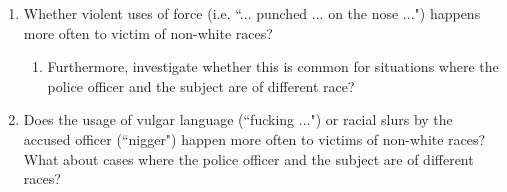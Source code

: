 \documentclass[10pt]{article}
\begin{document}
\begin{enumerate}

\item Whether violent uses of force (i.e. ``... punched ... on the nose ...") happens more often to victim of non-white races?

    \begin{enumerate}

    \item Furthermore, investigate whether this is common for situations where the police officer and the subject are of different race?

    \end{enumerate}

\item Does the usage of vulgar language (``fucking ...") or racial slurs by the accused officer (``nigger") happen more often to victims of non-white races? What about cases where the police officer and the subject are of different races?

\end{enumerate}
\end{document}
